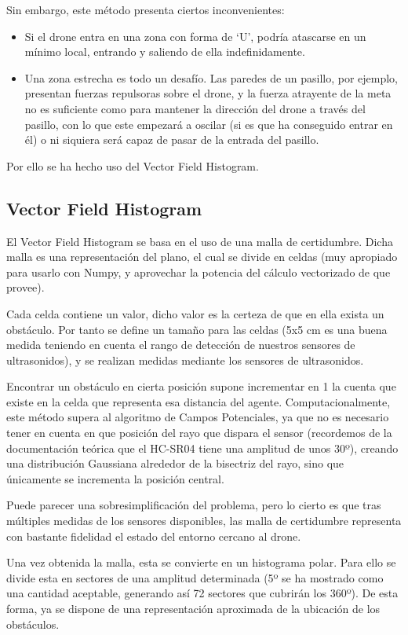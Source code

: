 Sin embargo, este método presenta ciertos inconvenientes:
\begin{itemize}
\item Si el drone entra en una zona con forma de `U', podría atascarse en un mínimo local, entrando y saliendo de ella indefinidamente. 
\item Una zona estrecha es todo un desafío. Las paredes de un pasillo, por ejemplo, presentan fuerzas repulsoras sobre el drone, y la fuerza atrayente de la meta no es suficiente como para mantener la dirección del drone a través del pasillo, con lo que este empezará a oscilar (si es que ha conseguido entrar en él) o ni siquiera será capaz de pasar de la entrada del pasillo.
\end{itemize}

Por ello se ha hecho uso del Vector Field Histogram.

\subsection{Vector Field Histogram}
\label{subsec:VFHcomments}
El Vector Field Histogram se basa en el uso de una malla de certidumbre. Dicha malla es una representación del plano, el cual se divide en celdas (muy apropiado para usarlo con Numpy, y aprovechar la potencia del cálculo vectorizado de que provee). 

Cada celda contiene un valor, dicho valor es la certeza de que en ella exista un obstáculo. Por tanto se define un tamaño para las celdas (5x5 cm es una buena medida teniendo en cuenta el rango de detección de nuestros sensores de ultrasonidos), y se realizan medidas mediante los sensores de ultrasonidos. 

Encontrar un obstáculo en cierta posición supone incrementar en 1 la cuenta que existe en la celda que representa esa distancia del agente. 
Computacionalmente, este método supera al algoritmo de Campos Potenciales, ya que no es necesario tener en cuenta en que posición del rayo que dispara el sensor (recordemos de la documentación teórica que el HC-SR04 tiene una amplitud de unos 30º), creando una distribución Gaussiana alrededor de la bisectriz del rayo, sino que únicamente se incrementa la posición central. 

Puede parecer una sobresimplificación del problema, pero lo cierto es que tras múltiples medidas de los sensores disponibles, las malla de certidumbre representa con bastante fidelidad el estado del entorno cercano al drone. 

Una vez obtenida la malla, esta se convierte en un histograma polar. Para ello se divide esta en sectores de una amplitud determinada (5º se ha mostrado como una cantidad aceptable, generando así 72 sectores que cubrirán los 360º). De esta forma, ya se dispone de una representación aproximada de la ubicación de los obstáculos. 

